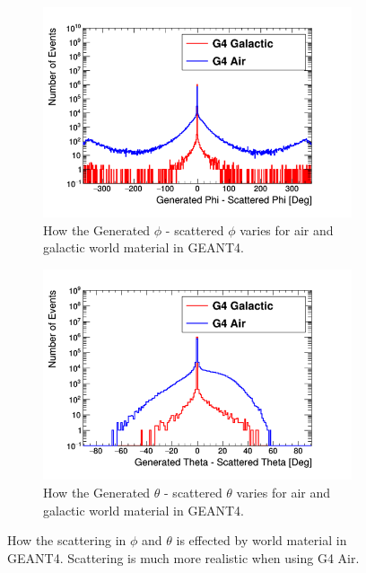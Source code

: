\begin{figure}[htbp]
\centering
\begin{subfigure}{.5\textwidth}
  \centering
  \includegraphics[width=\linewidth]{Chapter4/Figs/Raster/CryPlots/genPhi-scatPhi.png}
  \captionsetup{width=.9\linewidth}
  \caption{How the Generated $\phi$ - scattered $\phi$ varies for air and galactic world material in GEANT4.}
  \label{subFig:genPhi-scatPhi}
\end{subfigure}%
\begin{subfigure}{.5\textwidth}
  \centering
  \includegraphics[width=\linewidth]{Chapter4/Figs/Raster/CryPlots/genTheta-scatTheta.png}
  \captionsetup{width=.9\linewidth}
  \caption{How the Generated $\theta$ - scattered $\theta$ varies for air and galactic world material in GEANT4.}
  \label{subFig:genTheta-scatPhi}
\end{subfigure}
\caption{How the scattering in $\phi$ and $\theta$ is effected by world material in GEANT4. Scattering is much more realistic when using G4 Air.}
\label{fig:gen-scat_PhiTheta}
\end{figure}

